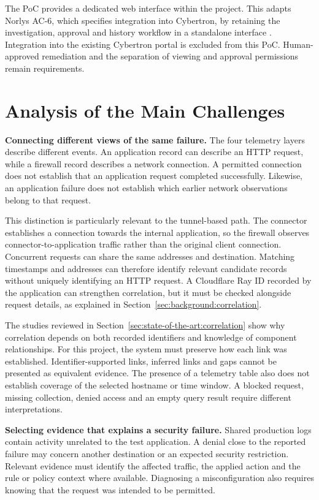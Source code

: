 The PoC provides a dedicated web interface within the project. This adapts
Norlys AC-6, which specifies integration into Cybertron, by retaining the
investigation, approval and history workflow in a standalone interface
\parencite[AC-6]{norlys_operations_agents}. Integration into the existing
Cybertron portal is excluded from this PoC. Human-approved remediation and
the separation of viewing and approval permissions remain requirements.

\section{Analysis of the Main Challenges}
\label{sec:requirements:analysis}

\noindent\textbf{Connecting different views of the same failure.}
The four telemetry layers describe different events. An application record
can describe an HTTP request, while a firewall record describes a network
connection. A permitted connection does not establish that an application
request completed successfully. Likewise, an application failure does not
establish which earlier network observations belong to that request.

This distinction is particularly relevant to the tunnel-based path. The
connector establishes a connection towards the internal application, so
the firewall observes connector-to-application traffic rather than the
original client connection. Concurrent requests can share the same
addresses and destination. Matching timestamps and addresses can therefore
identify relevant candidate records without uniquely identifying an HTTP
request. A Cloudflare Ray ID recorded by the application can strengthen
correlation, but it must be checked alongside request details, as explained
in Section~\ref{sec:background:correlation}.

The studies reviewed in Section~\ref{sec:state-of-the-art:correlation}
show why correlation depends on both recorded identifiers and knowledge
of component relationships. For this project, the system must preserve
how each link was established. Identifier-supported links, inferred links
and gaps cannot be presented as equivalent evidence. The presence of a
telemetry table also does not establish coverage of the selected hostname
or time window. A blocked request, missing collection, denied access and
an empty query result require different interpretations.

\noindent\textbf{Selecting evidence that explains a security failure.}
Shared production logs contain activity unrelated to the test application.
A denial close to the reported failure may concern another destination or
an expected security restriction. Relevant evidence must identify the
affected traffic, the applied action and the rule or policy context where
available. Diagnosing a misconfiguration also requires knowing that the
request was intended to be permitted.

